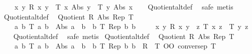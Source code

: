\begin{isabellebody}
\ \ \ \ {\isacharparenleft}{\kern0pt}{\isasymforall}x\ y{\isachardot}{\kern0pt}\ R\ x\ y\ {\isasymlongleftrightarrow}\ T\ x\ {\isacharparenleft}{\kern0pt}Abs\ y{\isacharparenright}{\kern0pt}\ {\isasymand}\ T\ y\ {\isacharparenleft}{\kern0pt}Abs\ x{\isacharparenright}{\kern0pt}{\isacharparenright}{\kern0pt}{\isachardoublequoteclose}\isanewline
%
\isadelimproof
\ \ %
\endisadelimproof
%
\isatagproof
{}\isamarkupfalse%
\ Quotient{\isacharunderscore}{\kern0pt}alt{\isacharunderscore}{\kern0pt}def\ \isamarkupfalse%
\ {\isacharparenleft}{\kern0pt}safe{\isacharcomma}{\kern0pt}\ metis{\isacharplus}{\kern0pt}{\isacharparenright}{\kern0pt}%
\endisatagproof
{\isafoldproof}%
%
\isadelimproof
\isanewline
%
\endisadelimproof
\isanewline
{}\isamarkupfalse%
\ Quotient{\isacharunderscore}{\kern0pt}alt{\isacharunderscore}{\kern0pt}def{}{\isacharcolon}{\kern0pt}\isanewline
\ \ {\isachardoublequoteopen}Quotient\ R\ Abs\ Rep\ T\ {\isasymlongleftrightarrow}\isanewline
\ \ \ \ {\isacharparenleft}{\kern0pt}{\isasymforall}a\ b{\isachardot}{\kern0pt}\ T\ a\ b\ {\isasymlongrightarrow}\ Abs\ a\ {\isacharequal}{\kern0pt}\ b{\isacharparenright}{\kern0pt}\ {\isasymand}\ {\isacharparenleft}{\kern0pt}{\isasymforall}b{\isachardot}{\kern0pt}\ T\ {\isacharparenleft}{\kern0pt}Rep\ b{\isacharparenright}{\kern0pt}\ b{\isacharparenright}{\kern0pt}\ {\isasymand}\isanewline
\ \ \ \ {\isacharparenleft}{\kern0pt}{\isasymforall}x\ y{\isachardot}{\kern0pt}\ R\ x\ y\ {\isasymlongleftrightarrow}\ {\isacharparenleft}{\kern0pt}{\isasymexists}z{\isachardot}{\kern0pt}\ T\ x\ z\ {\isasymand}\ T\ y\ z{\isacharparenright}{\kern0pt}{\isacharparenright}{\kern0pt}{\isachardoublequoteclose}\isanewline
%
\isadelimproof
\ \ %
\endisadelimproof
%
\isatagproof
{}\isamarkupfalse%
\ Quotient{\isacharunderscore}{\kern0pt}alt{\isacharunderscore}{\kern0pt}def{}\ \isamarkupfalse%
\ {\isacharparenleft}{\kern0pt}safe{\isacharcomma}{\kern0pt}\ metis{\isacharplus}{\kern0pt}{\isacharparenright}{\kern0pt}%
\endisatagproof
{\isafoldproof}%
%
\isadelimproof
\isanewline
%
\endisadelimproof
\isanewline
{}\isamarkupfalse%
\ Quotient{\isacharunderscore}{\kern0pt}alt{\isacharunderscore}{\kern0pt}def{}{\isacharcolon}{\kern0pt}\isanewline
\ \ {\isachardoublequoteopen}Quotient\ R\ Abs\ Rep\ T\ {\isasymlongleftrightarrow}\isanewline
\ \ \ \ {\isacharparenleft}{\kern0pt}{\isasymforall}a\ b{\isachardot}{\kern0pt}\ T\ a\ b\ {\isasymlongrightarrow}\ Abs\ a\ {\isacharequal}{\kern0pt}\ b{\isacharparenright}{\kern0pt}\ {\isasymand}\ {\isacharparenleft}{\kern0pt}{\isasymforall}b{\isachardot}{\kern0pt}\ T\ {\isacharparenleft}{\kern0pt}Rep\ b{\isacharparenright}{\kern0pt}\ b{\isacharparenright}{\kern0pt}\ {\isasymand}\ R\ {\isacharequal}{\kern0pt}\ T\ OO\ conversep\ T{\isachardoublequoteclose}\isanewline

\end{isabellebody}
